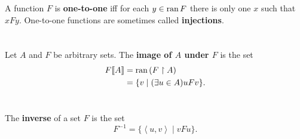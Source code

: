 \documentclass{report}
\begin{document}
A function $F$ is \textbf{one-to-one} iff for each $y \in \mathop{\text{ran}}{F}$ there is only
  one $x$ such that $xFy$.
One-to-one functions are sometimes called \textbf{injections}.

\begin{definition}

  \statementpadding




\end{definition}

\section{}%
\label{ref:image}

Let $A$ and $F$ be arbitrary sets.
The \textbf{image of $A$ under $F$} is the set
  \begin{align*}
    F\!\left\llbracket A\right\rrbracket
      & = \mathop{\text{ran}}{(F \restriction A)} \\
      & = \{v \mid (\exists u \in A) uFv\}.
  \end{align*}

\begin{definition}


\end{definition}

\section{}%
\label{ref:inverse}

The \textbf{inverse} of a set $F$ is the set
  $$F^{-1} = \{\left< u, v \right> \mid vFu\}.$$

\begin{definition}


\end{definition}

\section{}%
\label{ref:ordered-pair}
\end{document}

